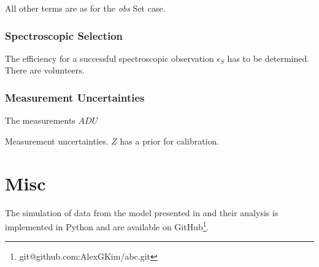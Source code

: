 \documentclass[preprint,3p]{elsarticle}
\begin{document}
All other terms are as for the {\it obs} Set case.

\subsubsection{Spectroscopic Selection}
The efficiency for a successful spectroscopic observation $\epsilon_S$ has
to be determined.  There are volunteers.

\subsubsection{Measurement Uncertainties}
The measurements $\mathit{ADU}$

Measurement uncertainties.
$Z$ has a prior for calibration.

\section{Misc}
The simulation of data from the model presented in
and their analysis is implemented in Python and are available
on GitHub\footnote{{git@github.com:AlexGKim/abc.git}}.

 

\end{document}
